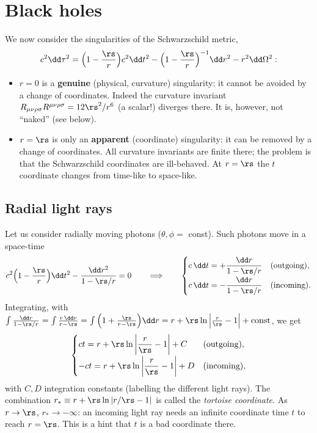 \chapter{Black holes}\label{ch:blackholes}

We now consider the singularities of the Schwarzschild metric,
\[
  c^2\dd\tau^2=\Big(1-\frac\rs r\Big)c^2\dd t^2-\Big(1-\frac\rs r\Big)^{-1}\dd r^2-r^2\dd\Omega^2 :
\]
\begin{itemize}[nosep]
\item $r=0$ is a \textbf{genuine} (physical, curvature) singularity: it cannot be avoided by a change of coordinates. Indeed the curvature invariant $R_{\mu\nu\rho\sigma}R^{\mu\nu\rho\sigma}=12\rs^2/r^6$ (a scalar!) diverges there. It is, however, not ``naked'' (see below).
\item $r=\rs$ is only an \textbf{apparent} (coordinate) singularity: it can be removed by a change of coordinates. All curvature invariants are finite there; the problem is that the Schwarzschild coordinates are ill-behaved. At $r=\rs$ the $t$ coordinate changes from time-like to space-like.
\end{itemize}

\section{Radial light rays}

Let us consider radially moving photons ($\theta,\phi=$ const). Such photons move in a space-time
\[
  c^2\Big(1-\frac\rs r\Big)\dd t^2-\frac{\dd r^2}{1-\rs/r}=0\qquad\Longrightarrow\qquad
  \begin{cases}c\,\dd t=+\dfrac{\dd r}{1-\rs/r}&\text{(outgoing)},\\[1.5ex] c\,\dd t=-\dfrac{\dd r}{1-\rs/r}&\text{(incoming)}.\end{cases}
\]
Integrating, with $\int\frac{\dd r}{1-\rs/r}=\int\frac{r\,\dd r}{r-\rs}=\int\Big(1+\frac{\rs}{r-\rs}\Big)\dd r=r+\rs\ln\Big|\frac r\rs-1\Big|+\text{const}$, we get
\begin{equation}
  \begin{cases} ct=r+\rs\ln\left|\dfrac r\rs-1\right|+C &\text{(outgoing)},\\[1.5ex] -ct=r+\rs\ln\left|\dfrac r\rs-1\right|+D &\text{(incoming)},\end{cases}
\end{equation}
with $C,D$ integration constants (labelling the different light rays). The combination $r_*\equiv r+\rs\ln|r/\rs-1|$ is called the \emph{tortoise coordinate}. As $r\to\rs$, $r_*\to-\infty$: an incoming light ray needs an infinite coordinate time $t$ to reach $r=\rs$. This is a hint that $t$ is a bad coordinate there.

